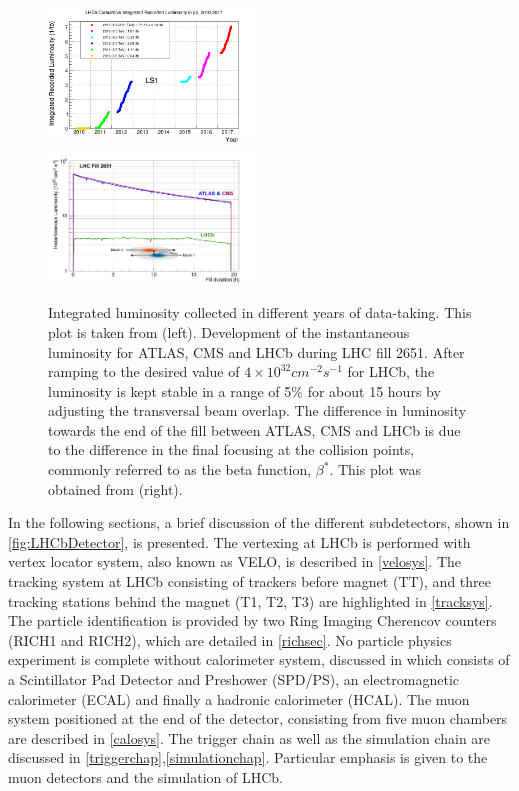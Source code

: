 \begin{figure}
	\centering
	\includegraphics[width = 0.5\textwidth]{figs/detector/intlumi.png}%
        \includegraphics[width = 0.5\textwidth]{figs/detector/lumicompare.png}
	\caption{Integrated luminosity collected in different years of data-taking. This plot is taken from \cite{lumiover} (left). Development of the instantaneous luminosity for \Gls{ATLAS}, \Gls{CMS} and \Gls{LHCb} during LHC fill 2651. After ramping to the desired value of $4\times10^{32}cm^{-2}s^{-1}$
for LHCb, the luminosity is kept stable in a range of 5$\%$ for about 15 hours by adjusting the transversal beam overlap. The difference in luminosity towards the end of the fill between ATLAS, \Gls{CMS} and \Gls{LHCb} is due to the difference in the final focusing at the collision points, commonly referred to as the beta function, $\beta^{*}$. This plot was obtained from \cite{LHCb-DP-2014-002} (right).}
	\label{fig:lhcbintlumi}
\end{figure}

In the following sections, a brief discussion of the different subdetectors, shown in \autoref{fig:LHCbDetector}, is presented. The vertexing at \gls{LHCb} is performed with vertex locator system, also known as VELO, is described in \autoref{velosys}. The tracking system at \gls{LHCb} consisting of trackers before magnet (TT), and three tracking stations behind the magnet (T1, T2, T3) are highlighted in \autoref{tracksys}. The particle identification is provided by two Ring Imaging Cherencov counters (RICH1 and RICH2), which are detailed in \autoref{richsec}. No particle physics experiment is complete without calorimeter system, discussed in  which consists of a Scintillator Pad Detector and Preshower (SPD/PS), an electromagnetic calorimeter (ECAL) and finally a hadronic calorimeter (HCAL). The muon system positioned at the end of the detector, consisting from five muon chambers are described in \autoref{calosys}. The trigger chain as well as the simulation chain are discussed in \autoref{triggerchap},\autoref{simulationchap}. Particular emphasis is given to the muon detectors and the simulation of \gls{LHCb}.

